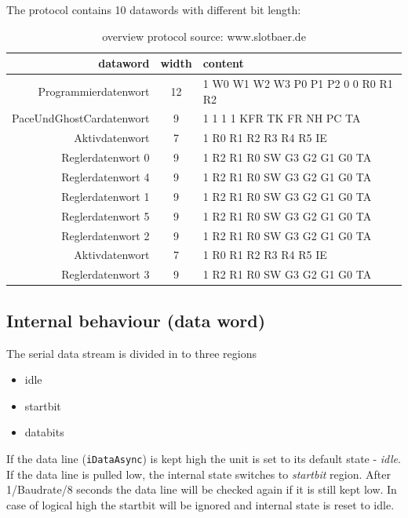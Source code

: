 \documentclass {scrartcl}
\begin{document}
The protocol contains 10 datawords with different bit length: 
\begin{table}[h]
	\centering
		\begin{tabular}{|r|c|l|}
				\hline
			dataword & width & content \\
		\hline
		\hline
Programmierdatenwort & 12 & 1 W0 W1 W2 W3 P0 P1 P2 0 0 R0 R1 R2\\
		\hline
PaceUndGhostCardatenwort & 9 & 1 1 1 1 KFR TK FR NH PC TA \\
		\hline
Aktivdatenwort & 7 & 1 R0 R1 R2 R3 R4 R5 IE \\
		\hline
Reglerdatenwort 0 & 9 & 1 R2 R1 R0 SW G3 G2 G1 G0 TA \\
		\hline
Reglerdatenwort 4 & 9 & 1 R2 R1 R0 SW G3 G2 G1 G0 TA \\
		\hline
Reglerdatenwort 1 & 9 & 1 R2 R1 R0 SW G3 G2 G1 G0 TA \\
		\hline
Reglerdatenwort 5 & 9 & 1 R2 R1 R0 SW G3 G2 G1 G0 TA \\
		\hline
Reglerdatenwort 2 & 9 & 1 R2 R1 R0 SW G3 G2 G1 G0 TA \\
		\hline
Aktivdatenwort &  7 &1 R0 R1 R2 R3 R4 R5 IE \\
		\hline
Reglerdatenwort 3 & 9 &1 R2 R1 R0 SW G3 G2 G1 G0 TA \\
		\hline
		\end{tabular}
	\caption{overview protocol source: www.slotbaer.de}
	\label{tab:overviewProtocol}
\end{table}



\subsection{Internal behaviour (data word)}
The serial data stream is divided in to three regions
\begin{itemize}
	\item idle
	\item startbit
	\item databits
\end{itemize}

If the data line (\texttt{iDataAsync}) is kept high the unit is set to its default state - \textit{idle}. If the data line is pulled low, the internal state switches to \textit{startbit} region. After 1/Baudrate/8 seconds the data line will be checked again if it is still kept low. In case of logical high the startbit will be ignored and internal state is reset to idle.
\end{document}
